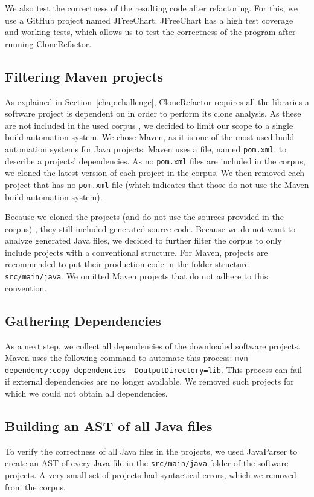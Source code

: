 We also test the correctness of the resulting code after refactoring. For this, we use a GitHub project named JFreeChart. JFreeChart has a high test coverage and working tests, which allows us to test the correctness of the program after running CloneRefactor.

\subsection{Filtering Maven projects}
As explained in Section~\ref{chap:challenge}, CloneRefactor requires all the libraries a software project is dependent on in order to perform its clone analysis. As these are not included in the used corpus \cite{githubCorpus2013}, we decided to limit our scope to a single build automation system. We chose Maven, as it is one of the most used build automation systems for Java projects. Maven uses a file, named \texttt{pom.xml}, to describe a projects' dependencies. As no \texttt{pom.xml} files are included in the corpus, we cloned the latest version of each project in the corpus. We then removed each project that has no \texttt{pom.xml} file (which indicates that those do not use the Maven build automation system).

Because we cloned the projects (and do not use the sources provided in the corpus) %
, they still included generated source code. Because we do not want to analyze generated Java files, we decided to further filter the corpus to only include projects with a conventional structure. For Maven, projects are recommended to put their production code in the folder structure \texttt{src/main/java}. We omitted Maven projects that do not adhere to this convention. %

\subsection{Gathering Dependencies}
As a next step, we collect all dependencies of the downloaded software projects. Maven uses the following command to automate this process: \texttt{mvn dependency:copy-dependencies -DoutputDirectory=lib}. This process can %
fail if external dependencies are no longer available. We removed such projects for which we could not obtain all dependencies.

\subsection{Building an AST of all Java files}
To verify the correctness of all Java files in the projects, we used JavaParser \cite{tomassetti2017javaparser} to create an AST of every Java file in the \texttt{src/main/java} folder of the software projects. A very small set of projects had syntactical errors, which we removed from the corpus. %

